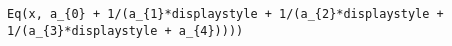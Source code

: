 \begin{verbatim}
Eq(x, a_{0} + 1/(a_{1}*displaystyle + 1/(a_{2}*displaystyle + 1/(a_{3}*displaystyle + a_{4}))))
\end{verbatim}